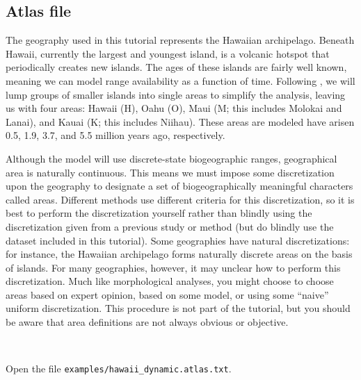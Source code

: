\documentclass[11pt]{article}
\newcommand{\impmark}{\strut\vadjust{\domark}}
\newcommand{\domark}{%
  \vbox to 0pt{
    \kern-\dp\strutbox
    \smash{\llap{$\rightarrow$\kern1em}}
    \vss
  }%
}
\begin{document}
\subsection{Atlas file}

The geography used in this tutorial represents the Hawaiian archipelago.
Beneath Hawaii, currently the largest and youngest island, is a volcanic hotspot that periodically creates new islands.
The ages of these islands are fairly well known, meaning we can model range availability as a function of time.
Following \citet{ree08}, we will lump groups of smaller islands into single areas to simplify the analysis, leaving us with four areas: Hawaii (H), Oahu (O), Maui (M; this includes Molokai and Lanai), and Kauai (K; this includes Niihau).
These areas are modeled have arisen 0.5, 1.9, 3.7, and 5.5 million years ago, respectively.

Although the model will use discrete-state biogeographic ranges, geographical area is naturally continuous.
This means we must impose some discretization upon the geography to designate a set of biogeographically meaningful characters called areas.
Different methods use different criteria for this discretization, so it is best to perform the discretization yourself rather than blindly using the discretization given from a previous study or method (but do blindly use the dataset included in this tutorial).
Some geographies have natural discretizations: for instance, the Hawaiian archipelago forms naturally discrete areas on the basis of islands.
For many geographies, however, it may unclear how to perform this discretization.
Much like morphological analyses, you might choose to choose areas based on expert opinion, based on some model, or using some ``naive'' uniform discretization.
This procedure is not part of the tutorial, but you should be aware that area definitions are not always obvious or objective.


\newpage

\noindent \\ \impmark  Open the file \texttt{examples/hawaii\_dynamic.atlas.txt}.
\end{document}
